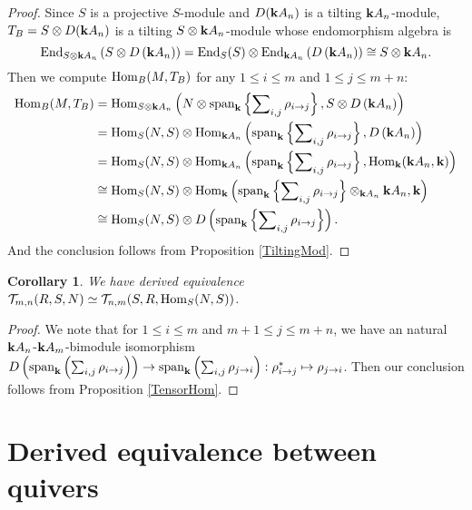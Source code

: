 \documentclass[a4paper, reqno]{amsart}
\newtheorem{cor}[thm]{Corollary}
\theoremstyle{definition}
\theoremstyle{remark}
\numberwithin{equation}{section}
\def\Hom{{\rm Hom}}
\def\End{{\rm End}}
\begin{document}
\begin{proof}
    Since $S$ is a projective $S$-module and $D({\bf k} A_n)$ is a tilting $ {\bf k}A_n$-module, $T_B = S\otimes D({\bf k} A_n)$ is a tilting $ S\otimes {\bf k}A_n$-module whose endomorphism algebra is 
    $$
    \End_{ S\otimes {\bf k}A_n}\left(S\otimes D\left({\bf k}A_n\right)\right) = \End_{S}(S)\otimes \End_{{\bf k}A_n} \left(D\left({\bf k}A_n\right)\right) \cong S\otimes {\bf k}A_n.
    $$
    Then we compute $\Hom_{B}(M,T_B) $ for any $1\leq i \leq m$ and $ 1\leq j \leq m+n$: 
    \begin{align*}
        \Hom_B(M,T_B) &= \Hom_{S\otimes {\bf k}A_n}\left(N \otimes {\rm span}_{\bf k}\left\{ \sum\nolimits_{i,j}\rho_{i\to j} \right\},S\otimes D\left({\bf k}A_n\right)\right)\\
        &= \Hom_{S}(N,S)\otimes \Hom_{{\bf k}A_n} \left({\rm span}_{\bf k}\left\{ \sum\nolimits_{i,j}\rho_{i\to j} \right\},D\left({\bf k}A_n\right)\right)\\
        &=  \Hom_{S}(N,S)\otimes \Hom_{{\bf k}A_n} \left({\rm span}_{\bf k}\left\{ \sum\nolimits_{i,j}\rho_{i\to j} \right\},\Hom_{\bf k}({\bf k}A_n,{\bf k})\right)\\
        &\cong \Hom_{S}(N,S)\otimes \Hom_{{\bf k}}\left({\rm span}_{\bf k}\left\{ \sum\nolimits_{i,j}\rho_{i\to j} \right\}\otimes_{{\bf k}A_n}{\bf k}A_n,{\bf k}\right)\\
        &\cong \Hom_{S}(N,S)\otimes D\left({\rm span}_{\bf k}\left\{ \sum\nolimits_{i,j}\rho_{i\to j} \right\}\right).
    \end{align*}
    And the conclusion follows from Proposition \ref{TiltingMod}.
\end{proof}

\begin{cor}
    We have derived equivalence $\mathcal{T}_{m,n}(R,S,N) \simeq \mathcal{T}_{n,m}(S,R,\Hom_{S}(N,S))$. 
\end{cor}

\begin{proof}
    We note that for $1\leq i \leq m$ and $m+1\leq j \leq m+n$, we have an natural ${\bf k}A_n$-${\bf k}A_m$-bimodule isomorphism $D\left({\rm span}_{\bf k}\left(\sum_{i,j}\rho_{i\to j}\right)\right) \to {\rm span}_{\bf k} \left(\sum_{i,j}\rho_{j\to i}\right): \rho_{i\to j}^{*} \mapsto \rho_{j\to i}$. Then our conclusion follows from Proposition \ref{TensorHom}.
\end{proof}


 
\section{Derived equivalence between quivers}
\end{document}
